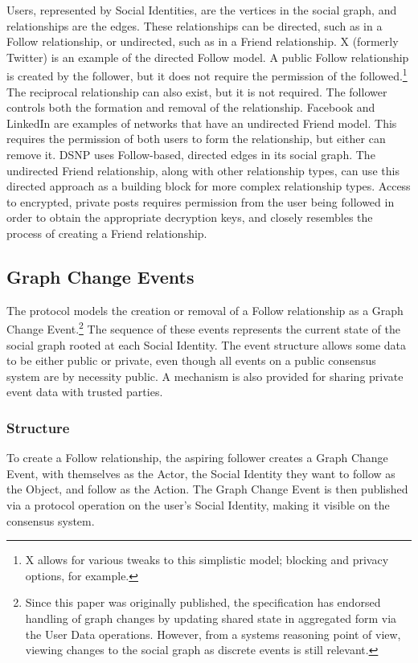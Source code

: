 \documentclass[12pt,letterpaper]{article}
\begin{document}
Users, represented by Social Identities, are the vertices in the social graph, and
relationships are the edges. These relationships can be directed, such as in a Follow
relationship, or undirected, such as in a Friend relationship. X (formerly Twitter) is an
example of the directed Follow model. A public Follow relationship is created by the
follower, but it does not require the permission of the followed.\footnote{X allows for
  various tweaks to this simplistic model; blocking and privacy options, for example.} The
reciprocal relationship can also exist, but it is not required. The follower controls both
the formation and removal of the relationship. Facebook and LinkedIn are examples of
networks that have an undirected Friend model. This requires the permission of both users to
form the relationship, but either can remove it. DSNP uses Follow-based, directed edges in
its social graph. The undirected Friend relationship, along with other relationship types,
can use this directed approach as a building block for more complex relationship
types. Access to encrypted, private posts requires permission from the user being followed
in order to obtain the appropriate decryption keys, and closely resembles the process of
creating a Friend relationship.

\subsection{Graph Change Events}\label{sec:graph_change_events}

The protocol models the creation or removal of a Follow relationship as a Graph Change
Event.\footnote{Since this paper was originally published, the specification has endorsed
  handling of graph changes by updating shared state in aggregated form via the User Data
  operations. However, from a systems reasoning point of view, viewing changes to the social
  graph as discrete events is still relevant.} The sequence of these events represents the
current state of the social graph rooted at each Social Identity. The event structure allows
some data to be either public or private, even though all events on a public consensus
system are by necessity public. A mechanism is also provided for sharing private event data
with trusted parties.

\subsubsection{Structure}

To create a Follow relationship, the aspiring follower creates a Graph Change Event, with
themselves as the Actor, the Social Identity they want to follow as the Object, and follow
as the Action. The Graph Change Event is then published via a protocol operation on the
user's Social Identity, making it visible on the consensus system.
\end{document}
